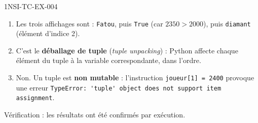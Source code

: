 \begin{corrige}{1NSI-TC-EX-004}
\begin{enumerate}
  \item Les trois affichages sont : \lstinline{Fatou}, puis \lstinline{True} (car $2350 > 2000$), puis \lstinline{diamant} (élément d'indice 2).

  \item C'est le \textbf{déballage de tuple} (\textit{tuple unpacking}) : Python affecte chaque élément du tuple à la variable correspondante, dans l'ordre.

  \item Non. Un tuple est \textbf{non mutable} : l'instruction \lstinline{joueur[1] = 2400} provoque une erreur \lstinline{TypeError: 'tuple' object does not support item assignment}.
\end{enumerate}

Vérification : les résultats ont été confirmés par exécution.
\end{corrige}

%
%
%
